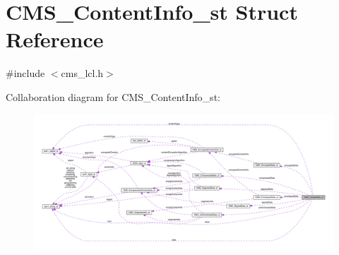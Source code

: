\hypertarget{struct_c_m_s___content_info__st}{}\section{C\+M\+S\+\_\+\+Content\+Info\+\_\+st Struct Reference}
\label{struct_c_m_s___content_info__st}


{\ttfamily \#include $<$cms\+\_\+lcl.\+h$>$}



Collaboration diagram for C\+M\+S\+\_\+\+Content\+Info\+\_\+st\+:\nopagebreak
\begin{figure}[H]
\begin{center}
\leavevmode
\includegraphics[width=350pt]{struct_c_m_s___content_info__st__coll__graph}
\end{center}
\end{figure}
